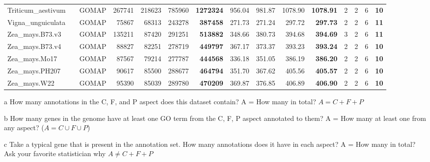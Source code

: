 \documentclass[utf8]{frontiersSCNS}
\begin{document}
\begin{table}[t]
{\begin{threeparttable}
\begin{tabular}{lrlrrr>{\bfseries}r|rrr>{\bfseries}r|rrr>{\bfseries}r}
\rowcolor{gray!6}  Triticum\_aestivum &  & GOMAP & 267741 & 218623 & 785960 & 1272324 & 956.04 & 981.87 & 1078.90 & 1078.91 & 2 & 2 & 6 & 10\\

Vigna\_unguiculata &  & GOMAP & 75867 & 68313 & 243278 & 387458 & 271.73 & 271.24 & 297.72 & 297.73 & 2 & 2 & 6 & 11\\

\rowcolor{gray!6}  Zea\_mays.B73.v3 &  & GOMAP & 135211 & 87420 & 291251 & 513882 & 348.66 & 380.73 & 394.68 & 394.69 & 3 & 2 & 6 & 11\\

Zea\_mays.B73.v4 &  & GOMAP & 88827 & 82251 & 278719 & 449797 & 367.17 & 373.37 & 393.23 & 393.24 & 2 & 2 & 6 & 10\\

\rowcolor{gray!6}  Zea\_mays.Mo17 &  & GOMAP & 87567 & 79214 & 277787 & 444568 & 336.18 & 351.05 & 386.19 & 386.20 & 2 & 2 & 6 & 10\\

Zea\_mays.PH207 &  & GOMAP & 90617 & 85500 & 288677 & 464794 & 351.70 & 367.62 & 405.56 & 405.57 & 2 & 2 & 6 & 10\\

\rowcolor{gray!6}  Zea\_mays.W22 & \multirow{-15}{*}{\raggedleft\arraybackslash 100} & GOMAP & 95390 & 85039 & 289780 & 470209 & 369.87 & 376.85 & 406.89 & 406.90 & 2 & 2 & 6 & 10\\
\bottomrule
\end{tabular}
\begin{tablenotes}
\item[a] How many annotations in the C, F, and P aspect does this dataset contain? A = How many in total? $A = C + F + P$
\item[b] How many genes in the genome have at least one GO term from the C, F, P aspect annotated to them? A = How many at least one from any aspect? ($A = C \cup F \cup P$)
\item[c] Take a typical gene that is present in the annotation set. How many annotations does it have in each aspect? A = How many in total? Ask your favorite statistician why $A \neq C + F +P$
\end{tablenotes}
\end{threeparttable}}
\end{table}
\end{document}
